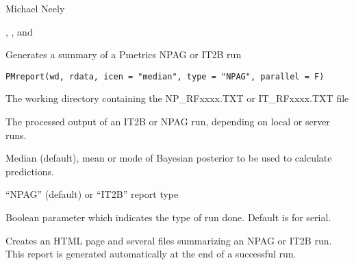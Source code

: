 \documentclass[a4paper]{book}
\begin{document}
%
\begin{Author}\relax
Michael Neely
\end{Author}
%
\begin{SeeAlso}\relax
{}, , and 
\end{SeeAlso}
%
\begin{Description}\relax
Generates a summary of a Pmetrics NPAG or IT2B run
\end{Description}
%
\begin{Usage}
\begin{verbatim}
PMreport(wd, rdata, icen = "median", type = "NPAG", parallel = F)
\end{verbatim}
\end{Usage}
%
\begin{Arguments}
\begin{ldescription}
\item[\code{wd}] The working directory containing the NP\_RFxxxx.TXT or IT\_RFxxxx.TXT file

\item[\code{rdata}] The processed output of an IT2B or NPAG run, depending on local or server runs.

\item[\code{icen}] Median (default), mean or mode of Bayesian posterior to be used to calculate predictions.

\item[\code{type}] ``NPAG'' (default) or ``IT2B'' report type

\item[\code{parallel}] Boolean parameter which indicates the type of run done.  Default is  for serial.
\end{ldescription}
\end{Arguments}
%
\begin{Details}\relax
Creates an HTML page and several files summarizing an NPAG or IT2B run.  This report is generated
automatically at the end of a successful run.
\end{Details}
%
\end{document}
